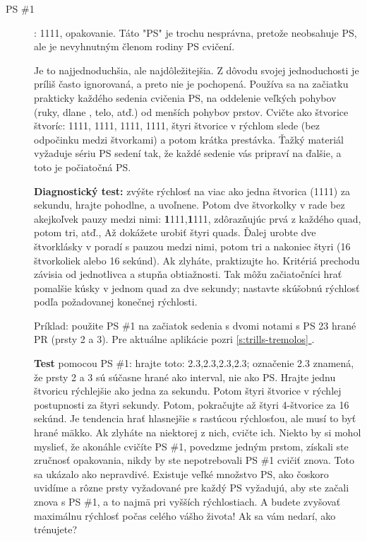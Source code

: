\documentclass[11pt,a4paper]{book}
\newcommand*{\fullref}[1]{\hyperref[{#1}]{\ref*{#1} \nameref*{#1}}} %
\begin{document}
\begin{description}
\item[PS \#1]: 1111, opakovanie. Táto "PS" je trochu nesprávna, pretože neobsahuje PS, ale je nevyhnutným členom rodiny PS cvičení.

Je to najjednoduchšia, ale najdôležitejšia. Z dôvodu svojej jednoduchosti je príliš často ignorovaná, a preto nie je pochopená. Používa sa na začiatku prakticky každého sedenia cvičenia PS, na oddelenie veľkých pohybov (ruky, dlane , telo, atď.) od menších pohybov prstov. Cvičte ako štvorice štvoríc: 1111, 1111, 1111, 1111, štyri štvorice v rýchlom slede (bez odpočinku medzi štvorkami) a potom krátka prestávka. Ťažký materiál vyžaduje sériu PS sedení tak, že každé sedenie vás pripraví na ďalšie, a toto je počiatočná PS.

\textbf{Diagnostický test:} zvýšte rýchlosť na viac ako jedna štvorica (1111) za sekundu, hrajte pohodlne, a uvoľnene. Potom dve štvorkolky v rade bez akejkoľvek pauzy medzi nimi: \textbf{1}111,\textbf{1}111, zdôrazňujúc prvá z každého quad, potom tri, atď., Až dokážete urobiť štyri quads. Ďalej urobte dve štvorklásky v poradí s pauzou medzi nimi, potom tri a nakoniec štyri (16 štvorkoliek alebo 16 sekúnd). Ak zlyháte, praktizujte ho. Kritériá prechodu závisia od jednotlivca a stupňa obtiažnosti. Tak môžu začiatočníci hrať pomalšie kúsky v jednom quad za dve sekundy; nastavte skúšobnú rýchlosť podľa požadovanej konečnej rýchlosti.

Príklad: použite PS \#1 na začiatok sedenia s dvomi notami s PS 23 hrané PR (prsty 2 a 3). Pre aktuálne aplikácie pozri \fullref{s:trills-tremolos}.

\textbf{Test} pomocou PS \#1: hrajte toto: 2.3,2.3,2.3,2.3; označenie 2.3 znamená, že prsty 2 a 3 sú súčasne hrané ako interval, nie ako PS. Hrajte jednu štvoricu rýchlejšie ako jedna za sekundu. Potom štyri štvorice v rýchlej postupnosti za štyri sekundy. Potom, pokračujte až štyri 4-štvorice za 16 sekúnd. Je tendencia hrať hlasnejšie s rastúcou rýchlosťou, ale musí to byť hrané mäkko. Ak zlyháte na niektorej z nich, cvičte ich. Niekto by si mohol myslieť, že akonáhle cvičíte PS \#1, povedzme jedným prstom, získali ste zručnosť opakovania, nikdy by ste nepotrebovali PS \#1 cvičiť znova. Toto sa ukázalo ako nepravdivé. Existuje veľké množstvo PS, ako čoskoro uvidíme a rôzne prsty vyžadované pre každý PS vyžadujú, aby ste začali znova s PS \#1, a to najmä pri vyšších rýchlostiach. A budete  zvyšovať maximálnu rýchlosť počas celého vášho života! Ak sa vám nedarí, ako trénujete?


\end{description}
\end{document}

